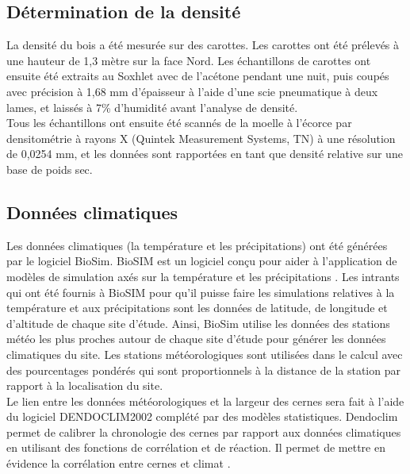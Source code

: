 \documentclass[a4paper,12pt]{report}
\begin{document}
\subsection*{Détermination de la densité}\label{densité}
La densité du bois a été mesurée sur des carottes. Les carottes ont été prélevés à une hauteur de 1,3 mètre sur la face Nord. Les échantillons de carottes ont ensuite été extraits au Soxhlet avec de l'acétone pendant une nuit, puis coupés avec précision à 1,68 mm d'épaisseur à l'aide d'une scie pneumatique à deux lames, et laissés à 7\% d'humidité avant l'analyse de densité.\\
 
Tous les échantillons ont ensuite été scannés de la moelle à l'écorce par densitométrie à rayons X (Quintek Measurement Systems, TN) à une résolution de 0,0254 mm, et les données sont rapportées en tant que densité relative sur une base de poids sec. %


\subsection*{Données climatiques}
Les données climatiques (la température et les précipitations) ont été générées par le logiciel BioSim. BioSIM est un logiciel conçu pour aider à l'application de modèles de simulation axés sur la température et les précipitations \citep{Regniere2014}. Les intrants qui ont été fournis à BioSIM pour qu'il puisse faire les simulations relatives à la température et aux précipitations sont les données de latitude, de longitude et d'altitude de chaque site d'étude. Ainsi, BioSim utilise les données des stations météo les plus proches autour de chaque site d'étude pour générer les données climatiques du site. Les stations météorologiques sont utilisées dans le calcul avec des pourcentages pondérés qui sont proportionnels à la distance de la station par rapport à la localisation du site.\\ 

Le lien entre les données météorologiques et la largeur des cernes sera fait à l'aide du logiciel DENDOCLIM2002 complété par des modèles statistiques. Dendoclim permet de calibrer la chronologie des cernes par rapport aux données climatiques en utilisant des fonctions de corrélation et de réaction. Il permet de mettre en évidence la corrélation entre cernes et climat \citep{Biondi2004}. 
\end{document}
